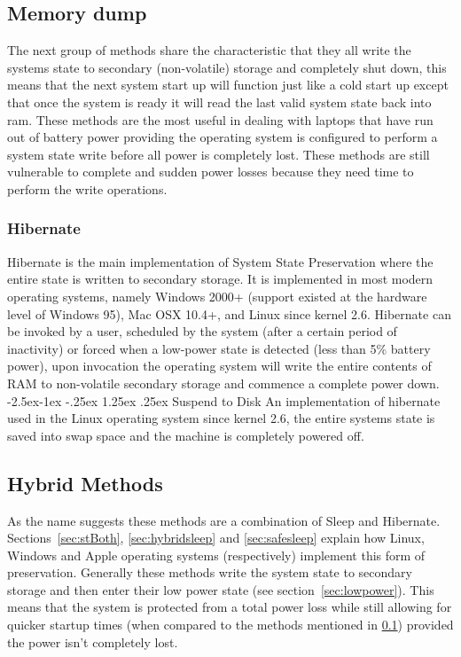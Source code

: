 \documentclass[a4,12pt]{article}
\makeatletter
\renewcommand\paragraph{\@startsection{paragraph}{4}{\z@}%
{-2.5ex\@plus -1ex \@minus -.25ex}%
{1.25ex \@plus .25ex}%
{\normalfont\normalsize\bfseries}}
\makeatother
\begin{document}
\subsection{Memory dump}\label{sec:memorydump}
The next group of methods share the characteristic that they all write the systems state to secondary (non-volatile) storage and completely shut down, this means that the next system start up will function just like a cold start up except that once the system is ready it will read the last valid system state back into ram.
These methods are the most useful in dealing with laptops that have run out of battery power providing the operating system is configured to perform a system state write before all power is completely lost. These methods are still vulnerable to complete and sudden power losses because they need time to perform the write operations.
\subsubsection{Hibernate}\label{sec:hibernate}
Hibernate is the main implementation of System State Preservation where the entire state is written to secondary storage. It is implemented in most modern operating systems, namely Windows 2000+ (support existed at the hardware level of Windows 95), Mac OSX 10.4+, and Linux since kernel 2.6.
Hibernate can be invoked by a user, scheduled by the system (after a certain period of inactivity) or forced when a low-power state is detected (less than 5\% battery power), upon invocation the operating system will write the entire contents of RAM to non-volatile secondary storage and commence a complete power down.
\paragraph{Suspend to Disk}\label{sec:stDisk}
An implementation of hibernate used in the Linux operating system since kernel 2.6, the entire systems state is saved into swap space and the machine is completely powered off.\citep{Wiki}
\subsection{Hybrid Methods}
As the name suggests these methods are a combination of Sleep and Hibernate. Sections~\ref{sec:stBoth}, \ref{sec:hybridsleep} and \ref{sec:safesleep} explain how Linux, Windows and Apple operating systems (respectively) implement this form of preservation.
Generally these methods write the system state to secondary storage and then enter their low power state (see section~\ref{sec:lowpower}). This means that the system is protected from a total power loss while still allowing for quicker startup times (when compared to the methods mentioned in \ref{sec:memorydump}) provided the power isn't completely lost. 
\end{document}
